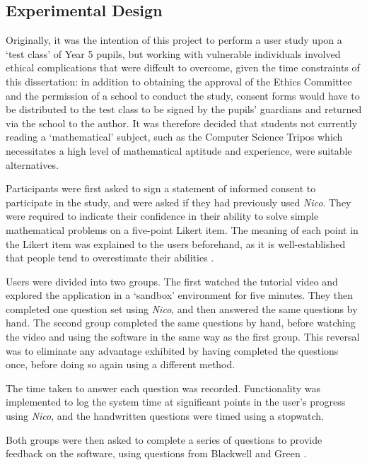 \documentclass[12pt,twoside,notitlepage,xetex]{report}
\begin{document}
\subsection{Experimental Design}

Originally, it was the intention of this project to perform a user study upon a `test class' of Year 5 pupils, but working with vulnerable individuals involved ethical complications that were diffcult to overcome, given the time constraints of this dissertation: in addition to obtaining the approval of the Ethics Committee and the permission of a school to conduct the study, consent forms would have to be distributed to the test class to be signed by the pupils' guardians and returned via the school to the author.  It was therefore decided that students not currently reading a `mathematical' subject, such as the Computer Science Tripos which necessitates a high level of mathematical aptitude and experience, were suitable alternatives.

Participants were first asked to sign a statement of informed consent to participate in the study, and were asked if they had previously used \emph{Nico}. They were required to indicate their confidence in their ability to solve simple mathematical problems on a five-point Likert item.  The meaning of each point in the Likert item was explained to the users beforehand, as it is well-established that people tend to overestimate their abilities \cite{Mura1987}.

Users were divided into two groups.  The first watched the tutorial video and explored the application in a `sandbox' environment for five minutes.  They then completed one question set using \emph{Nico}, and then answered the same questions by hand.  The second group completed the same questions by hand, before watching the video and using the software in the same way as the first group.  This reversal was to eliminate any advantage exhibited by having completed the questions once, before doing so again using a different method.

The time taken to answer each question was recorded.  Functionality was implemented to log the system time at significant points in the user's progress using \emph{Nico}, and the handwritten questions were timed using a stopwatch.

Both groups were then asked to complete a series of questions to provide feedback on the software, using questions from Blackwell and Green \cite{Blackwell2000}.
\end{document}
